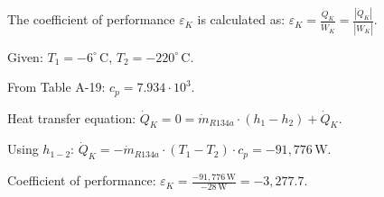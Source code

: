 The coefficient of performance \( \varepsilon_K \) is calculated as:  
\( \varepsilon_K = \frac{\dot{Q}_K}{\dot{W}_K} = \frac{|\dot{Q}_K|}{|\dot{W}_K|} \).  

Given:  
\( T_1 = -6^\circ \, \text{C} \), \( T_2 = -220^\circ \, \text{C} \).  

From Table A-19:  
\( c_p = 7.934 \cdot 10^3 \).  

Heat transfer equation:  
\( \dot{Q}_K = 0 = \dot{m}_{R134a} \cdot (h_1 - h_2) + \dot{Q}_K \).  

Using \( h_{1-2} \):  
\( \dot{Q}_K = -\dot{m}_{R134a} \cdot (T_1 - T_2) \cdot c_p = -91,776 \, \text{W} \).  

Coefficient of performance:  
\( \varepsilon_K = \frac{-91,776 \, \text{W}}{-28 \, \text{W}} = -3,277.7 \).